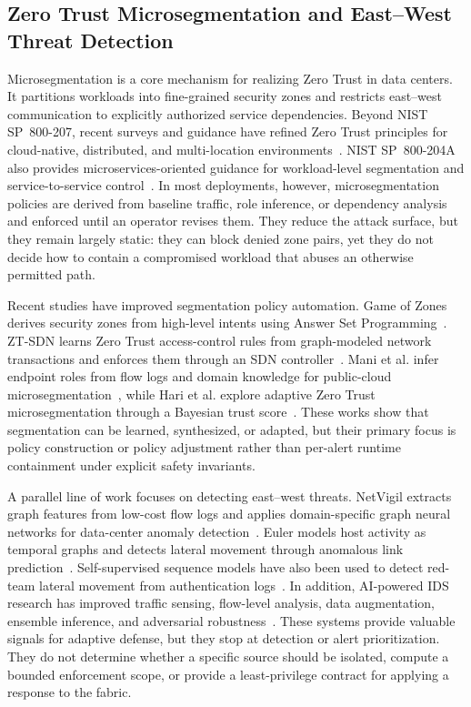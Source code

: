 \documentclass[final,5p]{elsarticle}
\begin{document}
\subsection{Zero Trust Microsegmentation and East--West Threat Detection}
\label{sec:rw_microseg}

Microsegmentation is a core mechanism for realizing Zero Trust in data centers. It partitions workloads into fine-grained security zones and restricts east--west communication to explicitly authorized service dependencies. Beyond NIST SP~800-207, recent surveys and guidance have refined Zero Trust principles for cloud-native, distributed, and multi-location environments~\cite{rose2020zerotrust,buck2021nevertrust,syed2022ztasurvey,chandramouli2023zta207a}. NIST SP~800-204A also provides microservices-oriented guidance for workload-level segmentation and service-to-service control~\cite{chandramouli2020sp800204a}. In most deployments, however, microsegmentation policies are derived from baseline traffic, role inference, or dependency analysis and enforced until an operator revises them. They reduce the attack surface, but they remain largely static: they can block denied zone pairs, yet they do not decide how to contain a compromised workload that abuses an otherwise permitted path.

Recent studies have improved segmentation policy automation. Game of Zones derives security zones from high-level intents using Answer Set Programming~\cite{canavese2025gameofzones}. ZT-SDN learns Zero Trust access-control rules from graph-modeled network transactions and enforces them through an SDN controller~\cite{katsis2025ztsdn}. Mani et al. infer endpoint roles from flow logs and domain knowledge for public-cloud microsegmentation~\cite{mani2025rolebased}, while Hari et al. explore adaptive Zero Trust microsegmentation through a Bayesian trust score~\cite{hari2026threetier}. These works show that segmentation can be learned, synthesized, or adapted, but their primary focus is policy construction or policy adjustment rather than per-alert runtime containment under explicit safety invariants.

A parallel line of work focuses on detecting east--west threats. NetVigil extracts graph features from low-cost flow logs and applies domain-specific graph neural networks for data-center anomaly detection~\cite{netvigil}. Euler models host activity as temporal graphs and detects lateral movement through anomalous link prediction~\cite{king2022euler}. Self-supervised sequence models have also been used to detect red-team lateral movement from authentication logs~\cite{gokstorp2024anomaly}. In addition, AI-powered IDS research has improved traffic sensing, flow-level analysis, data augmentation, ensemble inference, and adversarial robustness~\cite{cSDAID22,jSAID23,jAPELID24}. These systems provide valuable signals for adaptive defense, but they stop at detection or alert prioritization. They do not determine whether a specific source should be isolated, compute a bounded enforcement scope, or provide a least-privilege contract for applying a response to the fabric.
\end{document}
